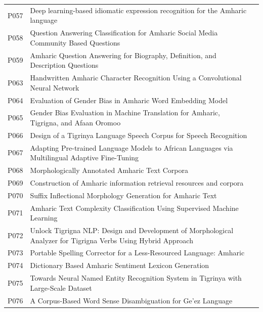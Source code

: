\documentclass[sn-mathphys-num]{sn-jnl}
\theoremstyle{thmstyleone}
\theoremstyle{thmstyletwo}
\theoremstyle{thmstylethree}
\begin{document}
\begin{appendices}
\begin{longtable}{@{}p{1.1cm}p{8.5cm}p{2.3cm}@{}}
P057 & Deep learning-based idiomatic expression recognition for the Amharic language & \citep{endalie_idiomatic_2023} \\
P058 & Question Answering Classification for Amharic Social Media Community Based Questions & \citep{destaw_questionanswering_2022} \\
P059 & Amharic Question Answering for Biography, Definition, and Description Questions & \citep{taffa_amharicquestion_2019} \\
P063 & Handwritten Amharic Character Recognition Using a Convolutional Neural Network & \citep{gondere_handwritten_2019} \\
P064 & Evaluation of Gender Bias in Amharic Word Embedding Model & \citep{zenebe_genderbias_2024} \\
P065 & Gender Bias Evaluation in Machine Translation for Amharic, Tigrigna, and Afaan Oromoo & \citep{sewunetie_genderbias_2024} \\
P066 & Design of a Tigrinya Language Speech Corpus for Speech Recognition & \citep{abera_designtigrinya_2018} \\
P067 & Adapting Pre-trained Language Models to African Languages via Multilingual Adaptive Fine-Tuning & \citep{alabi_adapting_2022} \\
P068 & Morphologically Annotated Amharic Text Corpora & \citep{yeshambel_morphologically_2021} \\
P069 & Construction of Amharic information retrieval resources and corpora & \citep{yeshambel_construction_2024} \\
P070 & Suffix Inflectional Morphology Generation for Amharic Text & \citep{nigusie_suffixinflectional_2024} \\
P071 & Amharic Text Complexity Classification Using Supervised Machine Learning & \citep{nigusie_amharictext_2023} \\
P072 & Unlock Tigrigna NLP: Design and Development of Morphological Analyzer for Tigrigna Verbs Using Hybrid Approach & \citep{gebremeskel_tigrigna_2023} \\
P073 & Portable Spelling Corrector for a Less-Resourced Language: Amharic & \citep{gezmu_portable_2018} \\
P074 & Dictionary Based Amharic Sentiment Lexicon Generation & \citep{alemneh_dictionary_2019} \\
P075 & Towards Neural Named Entity Recognition System in Tigrinya with Large-Scale Dataset & \citep{berhane_towards_2025} \\
P076 & A Corpus-Based Word Sense Disambiguation for Ge'ez Language & \citep{alemu_corpusbased_2021} \\

\end{longtable}
\end{appendices}
\end{document}

